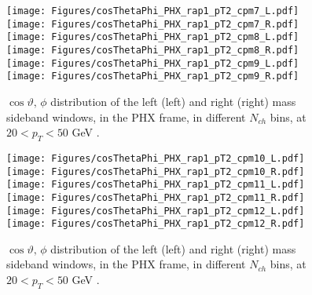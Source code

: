 \documentclass[12pt]{article}
\begin{document}
\begin{figure}[htbp]
\centering
\texttt{[image: Figures/cosThetaPhi\_PHX\_rap1\_pT2\_cpm7\_L.pdf]}
\texttt{[image: Figures/cosThetaPhi\_PHX\_rap1\_pT2\_cpm7\_R.pdf]}
\texttt{[image: Figures/cosThetaPhi\_PHX\_rap1\_pT2\_cpm8\_L.pdf]}
\texttt{[image: Figures/cosThetaPhi\_PHX\_rap1\_pT2\_cpm8\_R.pdf]}
\texttt{[image: Figures/cosThetaPhi\_PHX\_rap1\_pT2\_cpm9\_L.pdf]}
\texttt{[image: Figures/cosThetaPhi\_PHX\_rap1\_pT2\_cpm9\_R.pdf]}
\caption{$\cos\vartheta,\,\phi$ distribution of the left (left) and
  right (right) mass sideband windows, in the PHX frame, in different
  $N_{ch}$ bins, at $20 < p_{T} < 50$ GeV .}
\end{figure}
\clearpage

\begin{figure}[htbp]
\centering
\texttt{[image: Figures/cosThetaPhi\_PHX\_rap1\_pT2\_cpm10\_L.pdf]}
\texttt{[image: Figures/cosThetaPhi\_PHX\_rap1\_pT2\_cpm10\_R.pdf]}
\texttt{[image: Figures/cosThetaPhi\_PHX\_rap1\_pT2\_cpm11\_L.pdf]}
\texttt{[image: Figures/cosThetaPhi\_PHX\_rap1\_pT2\_cpm11\_R.pdf]}
\texttt{[image: Figures/cosThetaPhi\_PHX\_rap1\_pT2\_cpm12\_L.pdf]}
\texttt{[image: Figures/cosThetaPhi\_PHX\_rap1\_pT2\_cpm12\_R.pdf]}
\caption{$\cos\vartheta,\,\phi$ distribution of the left (left) and
  right (right) mass sideband windows, in the PHX frame, in different
  $N_{ch}$ bins, at $20 < p_{T} < 50$ GeV .}
\end{figure}
\clearpage
\end{document}
